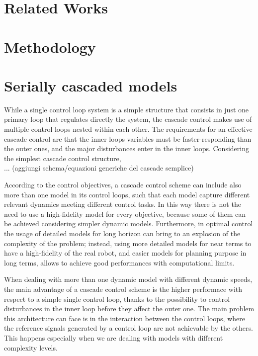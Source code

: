 \documentclass[a4paper, onecolumn, 11pt, twoside]{article}
\begin{document}

\section*{Related Works}

\section*{Methodology}



\section*{Serially cascaded models}
While a single control loop system is a simple structure that consists in
just one primary loop that regulates directly the system, the cascade control
makes use of multiple control loops nested within each other. The requirements
for an effective cascade control are that the inner loops variables must be 
faster-responding than the outer ones, and the major disturbances enter in the 
inner loops. Considering the simplest cascade control structure,\\
... (aggiungi schema/equazioni generiche del cascade semplice)

According to the control objectives, a cascade control scheme can include also 
more than one model in its control loops, such that each model capture different
relevant dynamics meeting different control tasks. In this way there is not the 
need to use a high-fidelity model for every objective, because some of them can 
be achieved considering simpler dynamic models. Furthermore, in optimal control
the usage of detailed models for long horizon can bring to an explosion of the 
complexity of the problem; instead, using more detailed models for near terms 
to have a high-fidelity of the real robot, and easier models for planning purpose
in long terms, allows to achieve good performances with computational limits.

When dealing with more than one dynamic model with different dynamic speeds,
the main advantage of a cascade control scheme is the higher performace with respect
to a simple single control loop, thanks to the possibility to control disturbances
in the inner loop before they affect the outer one. The main problem this architecture
can face is in the interaction between the control loops, where the reference signals 
generated by a control loop are not achievable by the others. This happens especially
when we are dealing with models with different complexity levels.
\end{document}
